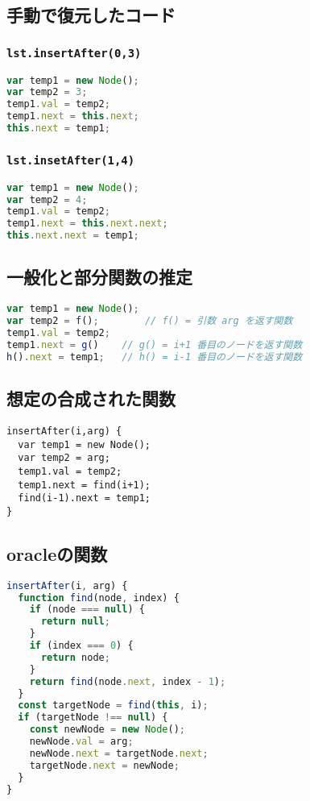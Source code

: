 \documentclass{article}
\begin{document}
\subsection{手動で復元したコード}

\subsubsection{\texttt{lst.insertAfter(0,3)}}
\begin{lstlisting}[language=JavaScript]
var temp1 = new Node();
var temp2 = 3;
temp1.val = temp2;
temp1.next = this.next;
this.next = temp1;
\end{lstlisting}

\subsubsection{\texttt{lst.insetAfter(1,4)}}
\begin{lstlisting}[language=JavaScript]
var temp1 = new Node();
var temp2 = 4;
temp1.val = temp2;
temp1.next = this.next.next;
this.next.next = temp1;
\end{lstlisting}

\subsection{一般化と部分関数の推定}

\begin{lstlisting}[language=JavaScript]
var temp1 = new Node();
var temp2 = f();        // f() = 引数 arg を返す関数
temp1.val = temp2;
temp1.next = g()    // g() = i+1 番目のノードを返す関数
h().next = temp1;   // h() = i-1 番目のノードを返す関数
\end{lstlisting}

\subsection{想定の合成された関数}
\begin{lstlisting}
insertAfter(i,arg) {
  var temp1 = new Node();
  var temp2 = arg;
  temp1.val = temp2;
  temp1.next = find(i+1);
  find(i-1).next = temp1;
}
\end{lstlisting}

\subsection{oracleの関数}
\begin{lstlisting}[language=JavaScript]
insertAfter(i, arg) {
  function find(node, index) {
    if (node === null) {
      return null;
    }
    if (index === 0) {
      return node;
    }
    return find(node.next, index - 1);
  }
  const targetNode = find(this, i);
  if (targetNode !== null) {
    const newNode = new Node();
    newNode.val = arg;
    newNode.next = targetNode.next;
    targetNode.next = newNode;
  }
}
\end{lstlisting}
\end{document}
